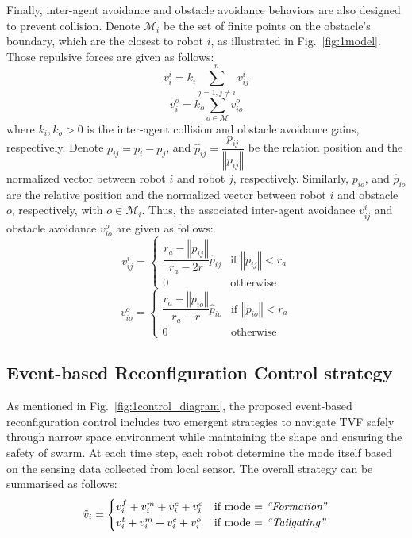 Finally, inter-agent avoidance and obstacle avoidance behaviors are also designed to prevent collision. Denote $\mathcal{M}_i$ be the set of finite points on the obstacle's boundary, which are the closest to robot $i$, as illustrated in Fig.~\ref{fig:1model}. Those repulsive forces are given as follows:
\begin{equation}
    v_i^i=k_{i}\sum_{j=1,j\neq i}^n{v_{ij}^i}
\end{equation}
\begin{equation}
    v_i^o=k_o\sum_{o\in\mathcal{M}}v_{io}^o
\end{equation}
where $k_i,k_o>0$ is the inter-agent collision and obstacle avoidance gains, respectively. Denote $p_{ij}=p_i-p_j$, and $\hat{p}_{ij}=\dfrac{p_{ij}}{\left\Vert p_{ij}\right\Vert}$ be the relation position and the normalized vector between robot $i$ and robot $j$, respectively. Similarly, $p_{io}$, and $\hat{p}_{io}$ are the relative position and the normalized vector between robot $i$ and obstacle $o$, respectively, with $o\in\mathcal{M}_i$. Thus, the associated inter-agent avoidance $v_{ij}^i$ and obstacle avoidance $v_{io}^o$ are given as follows:
\begin{equation}
    v_{ij}^{i}=\begin{cases}
    \dfrac{r_a-\left\Vert p_{ij}\right\Vert}{r_a -2r}\hat{p}_{ij} & \text{if }\left\Vert p_{ij}\right\Vert<r_{a} \\
    0 & \text{otherwise}
    \end{cases}
    \label{eqn:1ui}
\end{equation}
\begin{equation}
    v_{io}^{o}=\begin{cases}
    \dfrac{r_a-\left\Vert p_{io}\right\Vert}{r_a -r}\hat{p}_{io} & \text{if }\left\Vert p_{io}\right\Vert<r_{a} \\
    0 & \text{otherwise}
    \end{cases}
    \label{eqn:1uo}
\end{equation}

\subsection{Event-based Reconfiguration Control strategy}\label{sec:edc}

As mentioned in Fig.~\ref{fig:1control_diagram}, the proposed event-based reconfiguration control includes two emergent strategies to navigate TVF safely through narrow space environment while maintaining the shape and ensuring the safety of swarm. At each time step, each robot determine the mode itself based on the sensing data collected from local sensor. The overall strategy can be summarised as follows:
\begin{equation}
    \tilde{v}_i=\begin{cases}
        v_i^f+v_i^m+v_i^c+v_i^o & \text{if mode = \textit{``Formation''}}\\
        v_i^t+v_i^m+v_i^c+v_i^o & \text{if mode = \textit{``Tailgating''}}
    \end{cases}
    \label{eqn:1v}
\end{equation}

